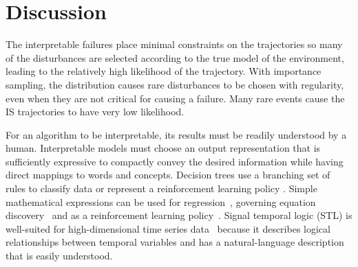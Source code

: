 \section{Discussion}

The interpretable failures place minimal constraints on the trajectories so many of the disturbances are selected according to the true model of the environment, leading to the relatively high likelihood of the trajectory. With importance sampling, the distribution causes rare disturbances to be chosen with regularity, even when they are not critical for causing a failure. Many rare events cause the IS trajectories to have very low likelihood.


For an algorithm to be interpretable, its results must be readily understood by a human. Interpretable models must choose an output representation that is sufficiently expressive to compactly convey the desired information while having direct mappings to words and concepts. Decision trees use a branching set of rules to classify data \cite{breiman2017classification} or represent a reinforcement learning policy \cite{rodriguez2019interpretable}. Simple mathematical expressions can be used for regression~\cite{schielzeth2010simple}, governing equation discovery~\cite{brunton2016discovering} and as a reinforcement learning policy~\cite{hein2017particle}. Signal temporal logic (STL) is well-suited for high-dimensional time series data~\cite{lee2018interpretable,vazquez2017logical} because it describes logical relationships between temporal variables and has a natural-language description that is easily understood.